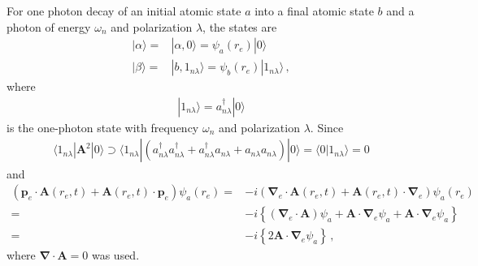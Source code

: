 For one photon decay of an initial atomic state $a$ into a final atomic state $b$ and a photon of energy $\omega_n$ and polarization $\lambda$, the states are
\begin{align}
  |\alpha\rangle=&|\alpha,0\rangle=\psi_a(r_e)|0\rangle\nonumber\\
  |\beta\rangle=&|b,1_{n\lambda}\rangle=\psi_b(r_e)|1_{n\lambda}\rangle\,,
\end{align}
where
\begin{align}
  |1_{n\lambda}\rangle=a_{n\lambda}^\dagger|0\rangle
\end{align}
is the one-photon state with frequency $\omega_n$ and polarization $\lambda$. Since
\begin{align}
 \langle1_{n\lambda}|\mathbf{A}^2|0\rangle\supset\langle1_{n\lambda}|(a_{n\lambda}^\dagger a_{n\lambda}^\dagger+a_{n\lambda}^\dagger a_{n\lambda}+a_{n\lambda}a_{n\lambda})|0\rangle=\langle0|1_{n\lambda}\rangle=0
\end{align}
and
\begin{align}
\left(\mathbf{p}_e\cdot\mathbf{A}(r_e,t)+\mathbf{A}(r_e,t)\cdot \mathbf{p}_e\right)\psi_a(r_e)=&
-i\left(\boldsymbol{\nabla}_e\cdot\mathbf{A}(r_e,t)+\mathbf{A}(r_e,t)\cdot\boldsymbol{\nabla}_e\right)\psi_a(r_e)
\nonumber\\
=&-i\left\{\left(\boldsymbol{\nabla}_e\cdot\mathbf{A}\right)\psi_a
+\mathbf{A}\cdot\boldsymbol{\nabla}_e\psi_a
+\mathbf{A}\cdot\boldsymbol{\nabla}_e\psi_a\right\}\nonumber\\
=&-i\left\{2\mathbf{A}\cdot\boldsymbol{\nabla}_e\psi_a\right\}\,,
\end{align}
where $\boldsymbol{\nabla}\cdot\mathbf{A}=0$ was used.

